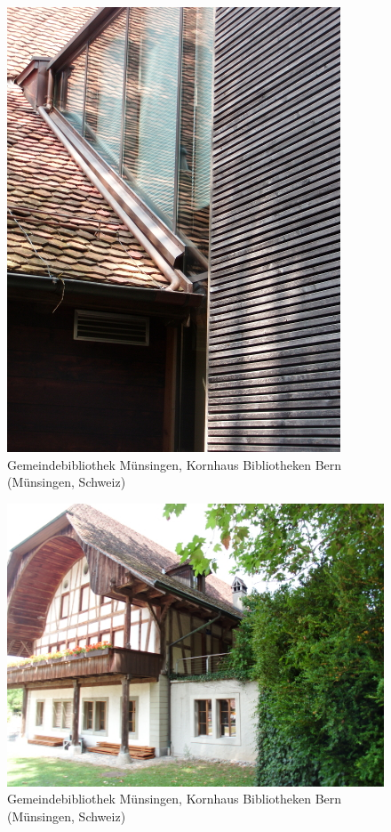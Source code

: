 \documentclass[a4paper,
fontsize=11pt,
oneside,
numbers=noperiodatend,
parskip=half-,
bibliography=totoc,
final
]{scrartcl}
\begin{document}
\begin{figure}[H]
\centering
\includegraphics{./img/064.jpg}
\caption{Gemeindebibliothek Münsingen, Kornhaus Bibliotheken Bern
(Münsingen,
Schweiz)}
\end{figure}

\begin{figure}[H]
\centering
\includegraphics{./img/065.jpg}
\caption{Gemeindebibliothek Münsingen, Kornhaus Bibliotheken Bern
(Münsingen,
Schweiz)}
\end{figure}
\end{document}
